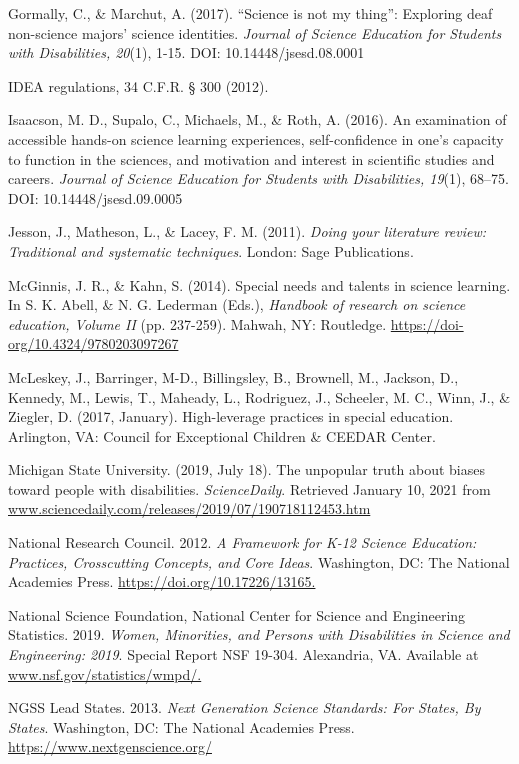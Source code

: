 \documentclass[11.5pt]{sig-alternate}
\begin{document}
Gormally, C., \& Marchut, A. (2017). “Science is not my thing”: Exploring deaf non-science majors’ science identities. \textit{Journal of Science Education for Students with Disabilities, 20}(1), 1-15. DOI: 10.14448/jsesd.08.0001

IDEA regulations, 34 C.F.R. § 300 (2012).

Isaacson, M. D., Supalo, C., Michaels, M., \& Roth, A. (2016). An examination of accessible hands-on science learning experiences, self-confidence in one’s capacity to function in the sciences, and motivation and interest in scientific studies and careers. \textit{Journal of Science Education for Students with Disabilities, 19}(1), 68–75. DOI: 10.14448/jsesd.09.0005 

Jesson, J., Matheson, L., \& Lacey, F. M. (2011). \textit{Doing your literature review: Traditional and systematic techniques}. London: Sage Publications. 

McGinnis, J. R., \& Kahn, S. (2014). Special needs and talents in science learning. In S. K. Abell, \& N. G. Lederman (Eds.), \textit{Handbook of research on science education, Volume II} (pp. 237-259). Mahwah, NY: Routledge. \url{https://doi-org/10.4324/9780203097267} 

McLeskey, J., Barringer, M-D., Billingsley, B., Brownell, M., Jackson, D., Kennedy, M., Lewis, T., Maheady, L., Rodriguez, J., Scheeler, M. C., Winn, J., \& Ziegler, D. (2017, January). High-leverage practices in special education. Arlington, VA: Council for Exceptional Children \& CEEDAR Center.

Michigan State University. (2019, July 18). The unpopular truth about biases toward people with disabilities. \textit{ScienceDaily}. Retrieved January 10, 2021 from \url{www.sciencedaily.com/releases/2019/07/190718112453.htm}

National Research Council. 2012. \textit{A Framework for K-12 Science Education: Practices, Crosscutting Concepts, and Core Ideas}. Washington, DC: The National Academies Press. \url{https://doi.org/10.17226/13165.}

National Science Foundation, National Center for Science and Engineering Statistics. 2019. \textit{Women, Minorities, and Persons with Disabilities in Science and Engineering: 2019}. Special Report NSF 19-304. Alexandria, VA. Available at \url{www.nsf.gov/statistics/wmpd/.} 

NGSS Lead States. 2013. \textit{Next Generation Science Standards: For States, By States}. Washington, DC: The National Academies Press. \url{https://www.nextgenscience.org/} 
\end{document}

